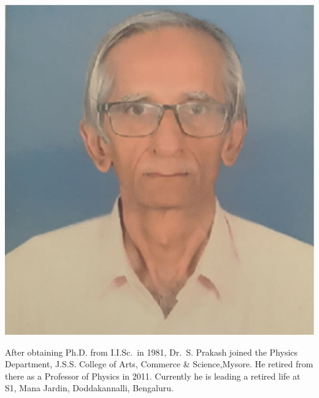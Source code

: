 \centerline{\includegraphics[scale=.12]{authorsphotos/S_Prakash.eps}}
\smallskip

\noindent
After obtaining Ph.D. from I.I.Sc.\ in 1981, Dr.\ S. Prakash joined the Physics Department, J.S.S. College of Arts, Commerce \& Science,\break Mysore. He retired from there as a Professor of Physics in 2011. Currently he is leading a retired life at S1, Mana Jardin, Doddakannalli, Bengaluru.
